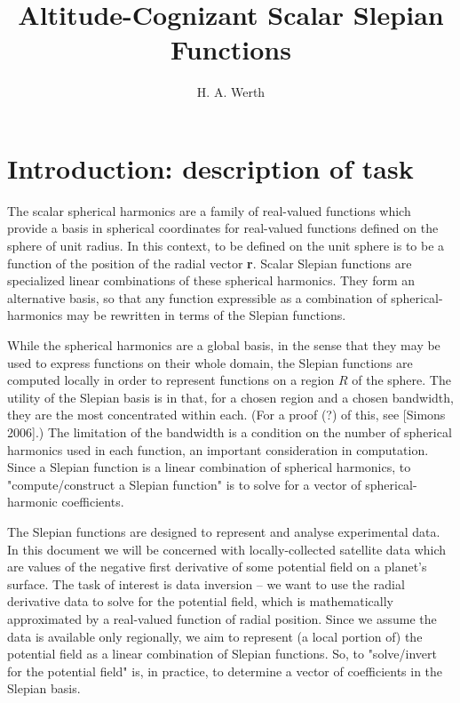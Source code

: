 \documentclass{article}
\title{Altitude-Cognizant Scalar Slepian Functions}
\author{H. A. Werth}
\date{}
\begin{document}
\maketitle

\tableofcontents 


\section{Introduction: description of task}

The scalar spherical harmonics are a family of real-valued functions which provide a basis in spherical coordinates for real-valued functions defined on the sphere of unit radius. In this context, to be defined on the unit sphere is to be a function of the position of the radial vector \textbf{r}. Scalar Slepian functions are specialized linear combinations of these spherical harmonics. They form an alternative basis, so that any function expressible as a combination of spherical-harmonics may be rewritten in terms of the Slepian functions. 

While the spherical harmonics are a global basis, in the sense that they may be used to express functions on their whole domain, the Slepian functions are computed locally in order to represent functions on a region $R$ of the sphere. The utility of the Slepian basis is in that, for a chosen region and a chosen bandwidth, they are the most concentrated within each. (For a proof (?) of this, see [Simons 2006].) The limitation of the bandwidth is a condition on the number of spherical harmonics used in each function, an important consideration in computation. Since a Slepian function is a linear combination of spherical harmonics, to "compute/construct a Slepian function" is to solve for a vector of spherical-harmonic coefficients.

The Slepian functions are designed to represent and analyse experimental data. In this document we will be concerned with locally-collected satellite data which are values of the negative first derivative of some potential field on a planet's surface. The task of interest is data inversion -- we want to use the radial derivative data to solve for the potential field, which is mathematically approximated by a real-valued function of radial position. Since we assume the data is available only regionally, we aim to represent (a local portion of) the potential field as a linear combination of Slepian functions. So, to "solve/invert for the potential field" is, in practice, to determine a vector of coefficients in the Slepian basis.
\end{document}
